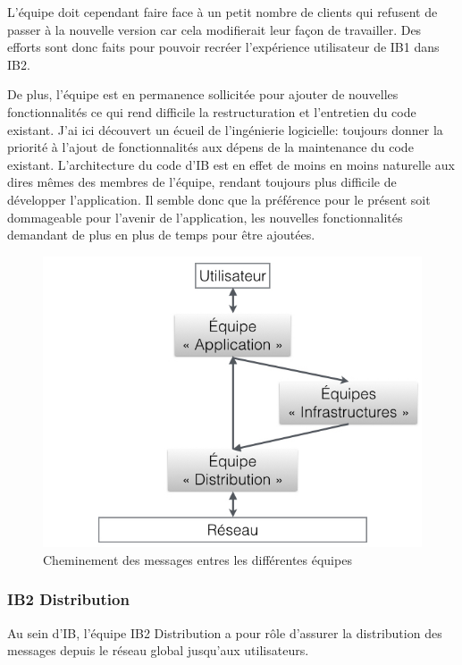 \documentclass[11pt, oneside, titlepage, a4paper]{article}
\begin{document}
L'équipe doit cependant faire face à un petit nombre de clients qui refusent de passer à la nouvelle version car cela modifierait leur façon de travailler. Des efforts sont donc faits pour pouvoir recréer l'expérience utilisateur de IB1 dans IB2.

De plus, l'équipe est en permanence sollicitée pour ajouter de nouvelles fonctionnalités ce qui rend difficile la restructuration et l'entretien du code existant. J'ai ici découvert un écueil de l'ingénierie logicielle: toujours donner la priorité à l'ajout de fonctionnalités aux dépens de la maintenance du code existant. L'architecture du code d'IB est en effet de moins en moins naturelle aux dires mêmes des membres de l'équipe, rendant toujours plus difficile de développer l'application. Il semble donc que la préférence pour le présent soit dommageable pour l'avenir de l'application, les nouvelles fonctionnalités demandant de plus en plus de temps pour être ajoutées.
\begin{figure}
\begin{center}
\includegraphics[scale=0.5]{IB.jpg}
\caption{Cheminement des messages entres les différentes équipes}
\end{center}
\end{figure}
		\subsubsection{IB2 Distribution}
Au sein d'IB, l'équipe IB2 Distribution a pour rôle d'assurer la distribution des messages depuis le réseau global jusqu'aux utilisateurs. 
\\
\end{document}
